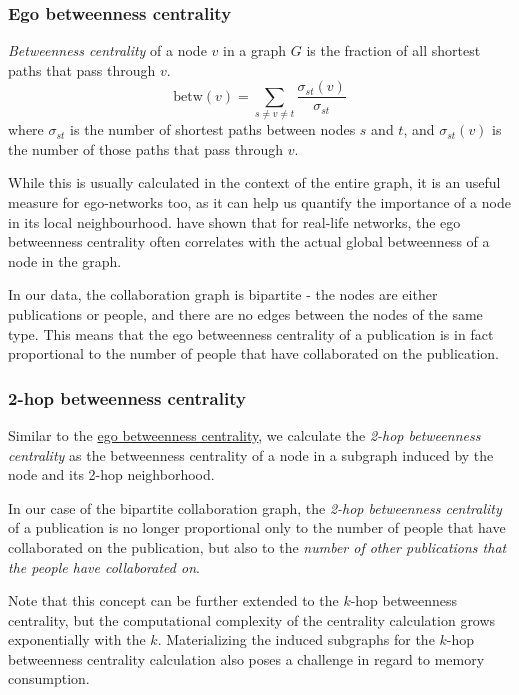 \subsubsection{Ego betweenness centrality}\label{ego-betweenness}

\textit{Betweenness centrality} of a node $v$ in a graph $G$ is the fraction of all shortest paths that pass through $v$.
$$
\text{betw}(v) = \sum_{s \neq v \neq t} \frac{\sigma_{st}(v)}{\sigma_{st}}
$$
where $\sigma_{st}$ is the number of shortest paths between nodes $s$ and $t$, and $\sigma_{st}(v)$ is the number of those paths that pass through $v$.

While this is usually calculated in the context of the entire graph, it is an useful measure for ego-networks too, as it can help us quantify the importance of a node in its local neighbourhood. 
\cite{egonetworkbetweenness} have shown that for real-life networks, the ego betweenness centrality often correlates with the actual global betweenness of a node in the graph.

In our data, the collaboration graph is bipartite - the nodes are either publications or people, and there are no edges between the nodes of the same type.
This means that the ego betweenness centrality of a publication is in fact proportional to the number of people that have collaborated on the publication.

\subsubsection{2-hop betweenness centrality}
Similar to the \hyperref[ego-betweenness]{ego betweenness centrality}, we calculate the \textit{2-hop betweenness centrality} as the betweenness centrality of a node 
in a subgraph induced by the node and its 2-hop neighborhood.

In our case of the bipartite collaboration graph, the \textit{2-hop betweenness centrality} of a publication is no longer proportional only to the number of people that have collaborated on the publication,
but also to the \textit{number of other publications that the people have collaborated on}.

Note that this concept can be further extended to the $k$-hop betweenness centrality, but the computational complexity of the centrality calculation grows exponentially with the $k$.
Materializing the induced subgraphs for the $k$-hop betweenness centrality calculation also poses a challenge in regard to memory consumption. 

